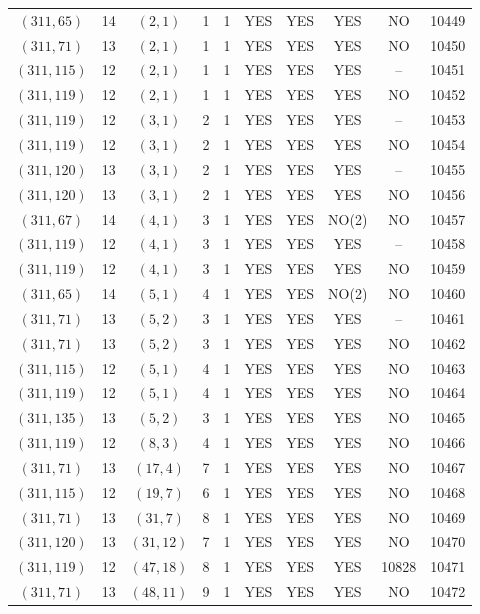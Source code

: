 \begin{longtable}{|c|c|c|c|c|c|c|c|c|c|}
$(311, 65)$ & 14 & $(2, 1)$ & 1 & 1 & YES & YES & YES & NO & 10449\\
$(311, 71)$ & 13 & $(2, 1)$ & 1 & 1 & YES & YES & YES & NO & 10450\\
$(311, 115)$ & 12 & $(2, 1)$ & 1 & 1 & YES & YES & YES & -- & 10451\\
$(311, 119)$ & 12 & $(2, 1)$ & 1 & 1 & YES & YES & YES & NO & 10452\\
$(311, 119)$ & 12 & $(3, 1)$ & 2 & 1 & YES & YES & YES & -- & 10453\\
$(311, 119)$ & 12 & $(3, 1)$ & 2 & 1 & YES & YES & YES & NO & 10454\\
$(311, 120)$ & 13 & $(3, 1)$ & 2 & 1 & YES & YES & YES & -- & 10455\\
$(311, 120)$ & 13 & $(3, 1)$ & 2 & 1 & YES & YES & YES & NO & 10456\\
$(311, 67)$ & 14 & $(4, 1)$ & 3 & 1 & YES & YES & NO(2) & NO & 10457\\
$(311, 119)$ & 12 & $(4, 1)$ & 3 & 1 & YES & YES & YES & -- & 10458\\
$(311, 119)$ & 12 & $(4, 1)$ & 3 & 1 & YES & YES & YES & NO & 10459\\
$(311, 65)$ & 14 & $(5, 1)$ & 4 & 1 & YES & YES & NO(2) & NO & 10460\\
$(311, 71)$ & 13 & $(5, 2)$ & 3 & 1 & YES & YES & YES & -- & 10461\\
$(311, 71)$ & 13 & $(5, 2)$ & 3 & 1 & YES & YES & YES & NO & 10462\\
$(311, 115)$ & 12 & $(5, 1)$ & 4 & 1 & YES & YES & YES & NO & 10463\\
$(311, 119)$ & 12 & $(5, 1)$ & 4 & 1 & YES & YES & YES & NO & 10464\\
$(311, 135)$ & 13 & $(5, 2)$ & 3 & 1 & YES & YES & YES & NO & 10465\\
$(311, 119)$ & 12 & $(8, 3)$ & 4 & 1 & YES & YES & YES & NO & 10466\\
$(311, 71)$ & 13 & $(17, 4)$ & 7 & 1 & YES & YES & YES & NO & 10467\\
$(311, 115)$ & 12 & $(19, 7)$ & 6 & 1 & YES & YES & YES & NO & 10468\\
$(311, 71)$ & 13 & $(31, 7)$ & 8 & 1 & YES & YES & YES & NO & 10469\\
$(311, 120)$ & 13 & $(31, 12)$ & 7 & 1 & YES & YES & YES & NO & 10470\\
$(311, 119)$ & 12 & $(47, 18)$ & 8 & 1 & YES & YES & YES & 10828 & 10471\\
$(311, 71)$ & 13 & $(48, 11)$ & 9 & 1 & YES & YES & YES & NO & 10472\\

\end{longtable}
